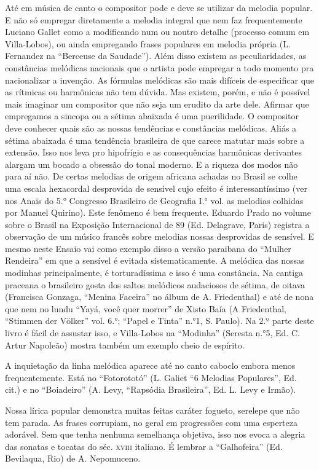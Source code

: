Até em música de canto o compositor pode e deve se utilizar da melodia
popular. E não só empregar diretamente a melodia integral que nem faz
frequentemente Luciano Gallet como a modificando num ou noutro detalhe
(processo comum em Villa-Lobos), ou ainda empregando frases populares em
melodia própria (L. Fernandez na ``Berceuse da Saudade''). Além disso
existem as peculiaridades, as constâncias melódicas nacionais que o
artista pode empregar a todo momento pra nacionalizar a invenção. As
fórmulas melódicas são mais difíceis de especificar que as rítmicas ou
harmônicas não tem dúvida. Mas existem, porém, e não é possível mais
imaginar um compositor que não seja um erudito da arte dele. Afirmar que
empregamos a sincopa ou a sétima abaixada é uma puerilidade. O
compositor deve conhecer quais são as nossas tendências e constâncias
melódicas. Aliás a sétima abaixada é uma tendência brasileira de que
carece matutar mais sobre a extensão. Isso nos leva pro hipofrígio e as
consequências harmônicas derivantes alargam um bocado a obsessão do
tonal moderno. E a riqueza dos modos não para aí não. De certas melodias
de origem africana achadas no Brasil se colhe uma escala hexacordal
desprovida de sensível cujo efeito é interessantíssimo (ver nos Anais do
5.° Congresso Brasileiro de Geografia I.° vol. as melodias colhidas por
Manuel Quirino). Este fenômeno é bem frequente. Eduardo Prado no volume
sobre o Brasil na Exposição Internacional de 89 (Ed. Delagrave, Paris)
registra a observação de um músico francês sobre melodias nossas
desprovidas de sensível. E mesmo neste Ensaio vai como exemplo disso a
versão paraibana do ``Mulher Rendeira'' em que a sensível é evitada
sistematicamente. A melódica das nossas modinhas principalmente, é
torturadíssima e isso é uma constância. Na cantiga praceana o brasileiro
gosta dos saltos melódicos audaciosos de sétima, de oitava (Francisca
Gonzaga, ``Menina Faceira'' no álbum de A. Friedenthal) e até de nona que
nem no lundu ``Yayá, você quer morrer'' de Xisto Baía (A Friedenthal,
``Stimmen der Völker'' vol. 6.°; ``Papel e Tinta'' n.°1, S. Paulo). Na 2.º
parte deste livro é fácil de assustar isso, e Villa-Lobos na ``Modinha''
(Seresta n.°5, Ed. C. Artur Napoleão) mostra também um exemplo cheio de
espírito.

A inquietação da linha melódica aparece até no canto caboclo embora
menos frequentemente. Está no ``Fotorototó'' (L. Galiet ``6 Melodias
Populares'', Ed. cit.) e no ``Boiadeiro'' (A. Levy, ``Rapsódia Brasileira'',
Ed. L. Levy e Irmão).

Nossa lírica popular demonstra muitas feitas caráter fogueto, serelepe
que não tem parada. As frases corrupiam, no geral em progressões com uma
esperteza adorável. Sem que tenha nenhuma semelhança objetiva, isso nos
evoca a alegria das sonatas e tocatas do séc. \textsc{xviii} italiano. É lembrar
a ``Galhofeira'' (Ed. Bevilaqua, Rio) de A. Nepomuceno.

